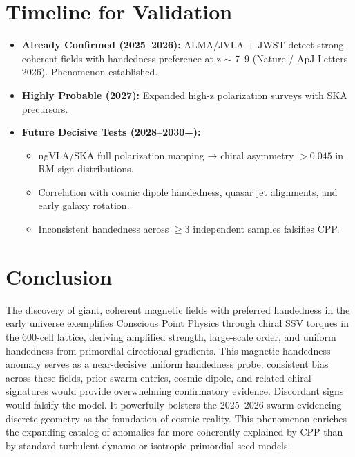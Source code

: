 \documentclass[11pt]{article}
\begin{document}
\section{Timeline for Validation}
\begin{itemize}
    \item \textbf{Already Confirmed (2025--2026):} ALMA/JVLA + JWST detect strong coherent fields with handedness preference at z $\sim$ 7--9 (Nature / ApJ Letters 2026). Phenomenon established.
    \item \textbf{Highly Probable (2027):} Expanded high-z polarization surveys with SKA precursors.
    \item \textbf{Future Decisive Tests (2028--2030+):}
    \begin{itemize}
        \item ngVLA/SKA full polarization mapping → chiral asymmetry $>0.045$ in RM sign distributions.
        \item Correlation with cosmic dipole handedness, quasar jet alignments, and early galaxy rotation.
        \item Inconsistent handedness across $\geq 3$ independent samples falsifies CPP.
    \end{itemize}
\end{itemize}

\section{Conclusion}
The discovery of giant, coherent magnetic fields with preferred handedness in the early universe exemplifies Conscious Point Physics through chiral SSV torques in the 600-cell lattice, deriving amplified strength, large-scale order, and uniform handedness from primordial directional gradients.  
This magnetic handedness anomaly serves as a near-decisive uniform handedness probe: consistent bias across these fields, prior swarm entries, cosmic dipole, and related chiral signatures would provide overwhelming confirmatory evidence. Discordant signs would falsify the model. It powerfully bolsters the 2025--2026 swarm evidencing discrete geometry as the foundation of cosmic reality.  
This phenomenon enriches the expanding catalog of anomalies far more coherently explained by CPP than by standard turbulent dynamo or isotropic primordial seed models.
\end{document}

